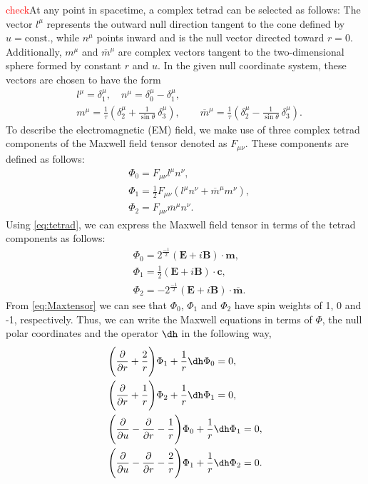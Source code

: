 \textcolor{red}{check}At any point in spacetime, a complex tetrad can be selected as follows: The vector $l^{\mu}$ represents the outward null direction tangent to the cone defined by $u = \text{const.}$, while $n^{\mu}$ points inward and is the null vector directed toward $r = 0$. Additionally, $m^{\mu}$ and $\overline{m}^{\mu}$ are complex vectors tangent to the two-dimensional sphere formed by constant $r$ and $u$. In the given null coordinate system, these vectors are chosen to have the form 
\begin{align}\label{eq:tetrad}
  & l^{\mu} = \delta_{1}^{\mu}, \quad n^{\mu} = \delta_{0}^{\mu} - \delta_{1}^{\mu}, \nonumber \\
  & m^{\mu} = \displaystyle\frac{1}{\tau}\left(\delta_{2}^{\mu} + \displaystyle\frac{1}{\sin\theta}\ \delta_{3}^{\mu}\right), \qquad \overline{m}^{\mu} = \displaystyle\frac{1}{\tau}\left(\delta_{2}^{\mu} - \displaystyle\frac{1}{\sin\theta}\ \delta_{3}^{\mu}\right).
\end{align}
To describe the electromagnetic (EM) field, we make use of three complex tetrad components of the Maxwell field tensor denoted as $F_{\mu \nu}$. These components are defined as follows:
\begin{align}\label{eq:Maxtensor}
  & \Phi_{0} = F_{\mu \nu}l^{\mu}n^{\nu}, \nonumber \\
  & \Phi_{1} = \frac{1}{2} F_{\mu \nu}(l^{\mu}n^{\nu} + \overline{m}^{\mu}m^{\nu}), \nonumber \\
  & \Phi_{2} = F_{\mu \nu}\overline{m}^{\mu}n^{\nu}.
\end{align}
Using \eqref{eq:tetrad}, we can express the Maxwell field tensor in terms of the tetrad components as follows:
\begin{align}\label{eq:Maxtensorintetrad}
  & \Phi_{0} = 2^{\frac{-1}{2}}(\boldsymbol{E} + i\boldsymbol{B})\cdot \boldsymbol{m}, \nonumber \\
  & \Phi_{1} = \frac{1}{2}(\boldsymbol{E} + i\boldsymbol{B})\cdot \boldsymbol{c} , \nonumber \\
  & \Phi_{2} = -2^{\frac{-1}{2}}(\boldsymbol{E} + i\boldsymbol{B})\cdot \boldsymbol{\overline{m}}.
\end{align}
From \eqref{eq:Maxtensor} we can see that $\Phi_{0}$, $\Phi_{1}$ and $\Phi_{2}$ have spin weights of 1, 0 and -1, respectively. Thus, we can write the Maxwell equations in terms of $\Phi$, the null polar coordinates and the operator $\dh$ in the following way,
\begin{align}\label{eq:MaxwellEqns}
  & \Biggl(\frac{\partial}{\partial r} + \frac{2}{r}\Biggr)\Phi_{1}  + \frac{1}{r}\dh \Phi_{0} = 0, \\ 
  & \Biggl(\frac{\partial}{\partial r} + \frac{1}{r}\Biggr)\Phi_{2}  + \frac{1}{r}\dh \Phi_{1} = 0, \\ 
  & \Biggl(\frac{\partial}{\partial u} - \frac{\partial}{\partial r} - \frac{1}{r}\Biggr)\Phi_{0}  + \frac{1}{r}\dh \Phi_{1} = 0, \\ 
  & \Biggl(\frac{\partial}{\partial u} - \frac{\partial}{\partial r} - \frac{2}{r}\Biggr)\Phi_{1}  + \frac{1}{r}\dh \Phi_{2} = 0. 
\end{align}
